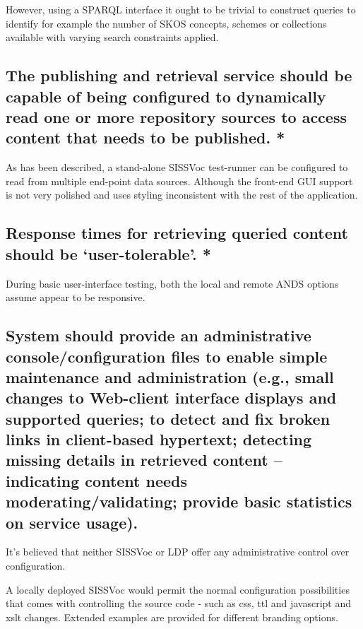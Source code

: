 \documentclass[10pt,a4paper]{article}
\begin{document}
\begin{flushleft}
  \item However, using a SPARQL interface it ought to be trivial to construct queries to identify
  for example the number of SKOS concepts, schemes or collections available with varying
  search constraints applied. 

\subsection{ The publishing and retrieval service should be capable of
being configured to dynamically read one or more repository sources to access
content that needs to be published. * }

  \item As has been described, a stand-alone SISSVoc test-runner can be configured to
  read from multiple end-point data sources. Although the front-end GUI support is not
  very polished and uses styling inconsistent with the rest of the
  application.


\subsection{ 
Response times for retrieving queried content should be ‘user-tolerable’. *
}

\item During basic user-interface testing, both the local and remote ANDS
options assume appear to be responsive.



\subsection{ System should provide an administrative console/configuration
files to enable simple maintenance and administration (e.g., small changes to
Web-client interface displays and supported queries; to detect and fix broken
links in client-based hypertext; detecting missing details in retrieved content
– indicating content needs moderating/validating; provide basic statistics on
service usage).
}

  \item It's believed that neither SISSVoc or LDP offer any administrative control over configuration. 

  \item A locally deployed SISSVoc would permit the normal configuration possibilities that comes with 
  controlling the source code - such as css, ttl and javascript and xslt changes. Extended examples are
  provided for different branding options.


\end{flushleft}
\end{document}
